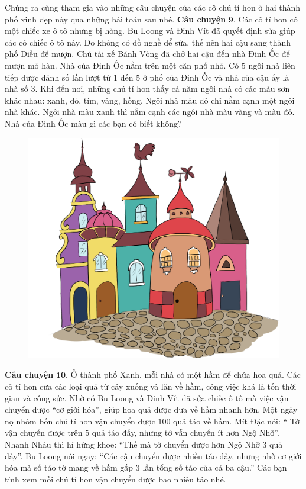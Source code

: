	Chúng ra cùng tham gia vào những câu chuyện của các cô chú tí hon ở hai thành phố xinh đẹp này qua những bài toán sau nhé.
	\vskip 0.1cm
	\textbf{\color{toancuabi}Câu chuyện} $\pmb{9.}$ Các cô tí hon có một chiếc xe ô tô nhưng bị hỏng. Bu Loong và Đinh Vít đã quyết định sửa giúp các cô chiếc ô tô này. Do  không có đồ nghề để sửa, thế nên hai cậu sang thành phố Diều để mượn. Chú tài xế Bánh Vòng đã chở hai cậu đến nhà Đinh Ốc để mượn mỏ hàn. Nhà của Đinh Ốc nằm trên một căn phố nhỏ. Có $5$ ngôi nhà liên tiếp được đánh số lần lượt từ $1$ đến $5$ ở phố của Đinh Ốc và nhà của cậu ấy là nhà số $3$. Khi đến nơi, những chú tí hon thấy cả năm ngôi nhà có các màu sơn khác nhau: xanh, đỏ, tím, vàng, hồng. Ngôi nhà màu đỏ chỉ nằm cạnh một ngôi nhà khác. Ngôi nhà màu xanh thì nằm cạnh các ngôi nhà màu vàng và màu đỏ. Nhà của Đinh Ốc màu gì các bạn có biết không?
		\begin{figure}[H]
		\centering
		\vspace*{-5pt}
		\captionsetup{labelformat= empty, justification=centering}
		\includegraphics[width=0.55\linewidth]{Hinh24_NhaDinhOc}
		\vspace*{-10pt}
	\end{figure}
	\textbf{\color{toancuabi}Câu chuyện} $\pmb{10.}$ Ở thành phố Xanh, mỗi nhà có một hầm để chứa hoa quả. Các cô tí hon cưa các loại quả từ cây xuống và lăn về hầm, công việc khá là tốn thời gian và công sức. Nhờ có Bu Loong và Đinh Vít đã sửa chiếc ô tô mà việc vận chuyển được “cơ giới hóa”, giúp hoa quả được đưa về hầm nhanh hơn. Một ngày nọ nhóm bốn chú tí hon vận chuyển được $100$ quả táo về hầm. Mít Đặc nói: “ Tớ vận chuyển được trên $5$ quả táo đấy, nhưng tớ vẫn chuyển ít hơn Ngộ Nhỡ”. Nhanh Nhảu thì hí hửng khoe: “Thế mà tớ chuyển được hơn Ngộ Nhỡ $3$ quả đấy”. Bu Loong nói ngay: “Các cậu chuyển được nhiều táo đấy, nhưng nhờ cơ giới hóa mà số táo tớ mang về hầm gấp $3$ lần tổng số táo của cả ba cậu.” Các bạn tính xem mỗi chú tí hon vận chuyển được bao nhiêu táo nhé.

